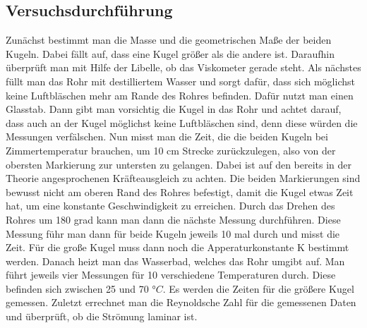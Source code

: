 \documentclass[titlepage=firstiscover, bibliography=totoc, captions=tableheading]{scrartcl}
\begin{document}
\subsection{Versuchsdurchführung}
Zunächst bestimmt man die Masse und die geometrischen Maße der beiden Kugeln.
Dabei fällt auf, dass eine Kugel größer als die andere ist.
Daraufhin überprüft man mit Hilfe der Libelle, ob das Viskometer gerade steht.
Als nächstes füllt man das Rohr mit destilliertem Wasser und sorgt dafür, dass sich
möglichst keine Luftbläschen mehr am Rande des Rohres befinden. Dafür nutzt man
einen Glasstab. Dann gibt man vorsichtig die Kugel in das Rohr und achtet
darauf, dass auch an der Kugel möglichst keine Luftbläschen sind, denn diese
würden die Messungen verfälschen. Nun misst man die Zeit, die die beiden Kugeln
bei Zimmertemperatur brauchen, um 10 cm Strecke zurückzulegen, also von der
obersten Markierung zur untersten zu gelangen. Dabei ist auf den bereits in der
Theorie angesprochenen Kräfteausgleich zu achten. Die beiden Markierungen sind
bewusst nicht am oberen Rand des Rohres befestigt, damit die Kugel etwas Zeit
hat, um eine konstante Geschwindigkeit zu erreichen. Durch
das Drehen des Rohres um 180 grad kann man dann die nächste Messung durchführen.
Diese Messung führ man dann für beide Kugeln jeweils 10 mal durch und misst die
Zeit. Für die große Kugel muss dann noch die Apperaturkonstante K bestimmt
werden. Danach heizt man das Wasserbad, welches das Rohr umgibt auf. Man führt
jeweils vier Messungen für 10 verschiedene Temperaturen durch. Diese
befinden sich zwischen 25 und 70 $°C$. Es werden die Zeiten für die größere
Kugel gemessen.
Zuletzt errechnet man die Reynoldsche Zahl für die gemessenen Daten und
überprüft, ob die Strömung laminar ist.
\printbibliography
\end{document}
